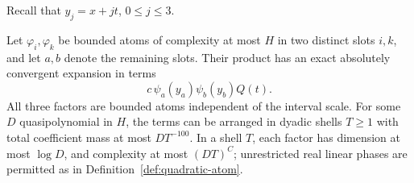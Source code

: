 Recall that \(y_j=x+jt\), \(0\le j\le3\).

\begin{lemma}\label{lem:ap-separation}
Let \(\varphi_i,\varphi_k\) be bounded atoms of complexity at most \(H\)
in two distinct slots \(i,k\), and let \(a,b\) denote the remaining
slots.  Their product has an exact absolutely convergent expansion
in terms
\begin{equation*}
 c\,\psi_a(y_a)\psi_b(y_b)Q(t).
 \tag{4}\label{eq:src-4}
\end{equation*}
All three factors are bounded atoms independent of the interval scale.
For some \(D\) quasipolynomial in \(H\), the terms can be arranged in
dyadic shells \(T\ge1\) with total coefficient mass at most
\(DT^{-100}\).  In a shell \(T\), each factor has dimension at most
\(\log D\), and complexity at most \((DT)^C\); unrestricted real linear
phases are permitted as in Definition~\ref{def:quadratic-atom}.
\end{lemma}

